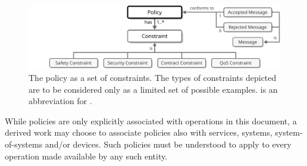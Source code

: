 \begin{figure}[ht!]
  \centering
  \includegraphics[scale=0.9]{figures/policy}
  \caption{
    The policy as a set of constraints.
    The types of constraints depicted are to be considered only as a limited set of possible examples.
     is an abbreviation for .
  }
  \label{fig:policy}
\end{figure}

While policies are only explicitly associated with operations in this document, a derived work may choose to associate policies also with services, systems, system-of-systems and/or devices.
Such policies must be understood to apply to every operation made available by any such entity.
